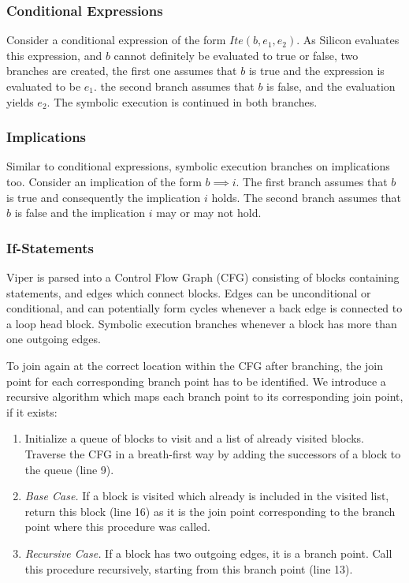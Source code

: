 \documentclass[11pt]{article}
\begin{document}
    \subsubsection{Conditional Expressions}

    Consider a conditional expression of the form $Ite(b, e_1, e_2)$.
    As Silicon evaluates this expression, and $b$ cannot definitely be evaluated to true or false,
    two branches are created, the first one assumes that $b$
    is true and the expression is evaluated to be $e_1$.
    the second branch assumes that $b$ is false, and the evaluation yields $e_2$.
    The symbolic execution is continued in both branches.


    \subsubsection{Implications}

    Similar to conditional expressions, symbolic execution branches on implications too. Consider
    an implication of the form $b \implies i$. The first branch assumes that $b$ is true and
    consequently the implication $i$ holds. The second branch assumes that $b$ is false and the
    implication $i$ may or may not hold. 

    \subsubsection{If-Statements} \label{if-statements}

    Viper is parsed into a Control Flow Graph (CFG) consisting of blocks containing
    statements, and edges which connect blocks. Edges can be unconditional or conditional,
    and can potentially form cycles whenever a back edge is connected to a loop head block.
    Symbolic execution branches whenever a block has more than one outgoing edges.

    To join again at the correct location within the CFG after branching,
    the join point for each corresponding branch point has to be identified.
    We introduce a recursive algorithm which maps each branch point to its corresponding join point,
    if it exists:

    \begin{enumerate}
        \item Initialize a queue of blocks to visit and a list of already visited blocks.
            Traverse the CFG in a breath-first way by adding the successors of a block
            to the queue (line 9).
        \item \emph{Base Case.} If a block is visited which already is included in the visited list,
            return this block (line 16) as it is the join point corresponding to the branch point where this procedure was called.
        \item \emph{Recursive Case.} If a block has two outgoing edges, it is a branch point.
            Call this procedure recursively, starting from this branch point (line 13).
    \end{enumerate}
\end{document}
